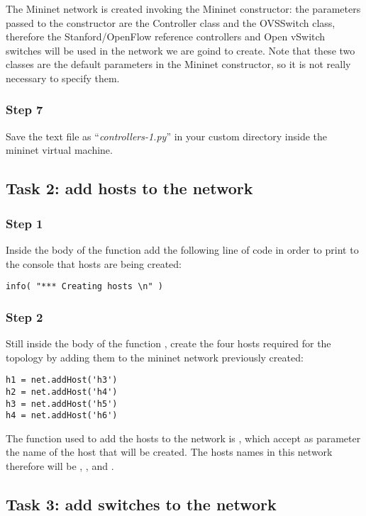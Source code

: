 The Mininet network is created invoking the Mininet constructor: the parameters
passed to the constructor are the Controller class and the OVSSwitch class, therefore
the Stanford/OpenFlow reference controllers and Open vSwitch switches will be used
in the network we are goind to create. Note that these two classes are
the default parameters in the Mininet constructor, so it is not really necessary
to specify them.

\subsubsection*{Step 7}
Save the text file as ``\emph{controllers-1.py}'' in your custom directory inside
the mininet virtual machine.





\subsection*{Task 2: add hosts to the network}
\subsubsection*{Step 1}
Inside the body of the function  add the following line
of code in order to print to the console that hosts are being created:
\begin{lstlisting}
info( "*** Creating hosts \n" )
\end{lstlisting}

\subsubsection*{Step 2}
Still inside the body of the function , create the
four hosts required for the topology by adding them to the mininet network
previously created:
\begin{lstlisting}
h1 = net.addHost('h3')
h2 = net.addHost('h4')
h3 = net.addHost('h5')
h4 = net.addHost('h6')
\end{lstlisting}
The function used to add the hosts to the network is , which
accept as parameter the name of the host that will be created. The hosts names in
this network therefore will be , ,  and .





\subsection*{Task 3: add switches to the network}
